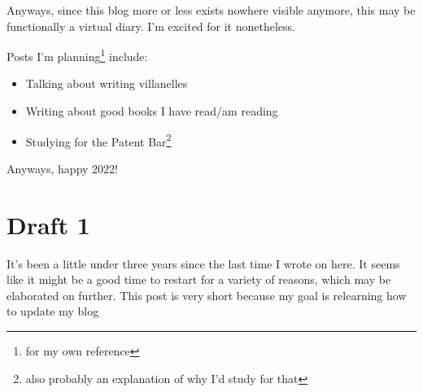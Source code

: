 \documentclass[12pt]{article}[titlepage]
\newcommand{\1}{\={a}}
\newcommand{\2}{\={e}}
\newcommand{\3}{\={\i}}
\newcommand{\4}{\=o}
\newcommand{\5}{\=u}
\newcommand{\6}{\={A}}
\renewcommand{\,}{\textsuperscript{,}}
\begin{document}
Anyways, since this blog more or less exists nowhere visible anymore, this may be functionally a virtual diary.
I'm excited for it nonetheless.

Posts I'm planning\footnote{for my own reference} include:
\begin{itemize}
\item Talking about writing villanelles
\item Writing about good books I have read/am reading
\item Studying for the Patent Bar\footnote{also probably an explanation of why I'd study for that}
\end{itemize}

Anyways, happy 2022!
\section{Draft 1}
It's been a little under three years since the last time I wrote on here.
It seems like it might be a good time to restart for a variety of reasons, which may be elaborated on further.
This post is very short because my goal is relearning how to update my blog
\end{document}
